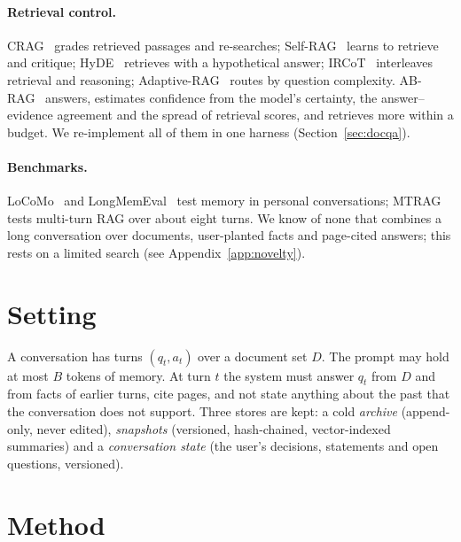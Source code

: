 \documentclass[10pt,twocolumn]{article}
\begin{document}
\paragraph{Retrieval control.}
CRAG~\cite{yan2024crag} grades retrieved passages and re-searches; Self-RAG~\cite{asai2023selfrag} learns to retrieve and critique; HyDE~\cite{gao2022hyde} retrieves with a hypothetical answer; IRCoT~\cite{trivedi2022ircot} interleaves retrieval and reasoning; Adaptive-RAG~\cite{jeong2024adaptiverag} routes by question complexity. AB-RAG~\cite{kamthan2026abrag} answers, estimates confidence from the model's certainty, the answer--evidence agreement and the spread of retrieval scores, and retrieves more within a budget. We re-implement all of them in one harness (Section~\ref{sec:docqa}).

\paragraph{Benchmarks.}
LoCoMo~\cite{maharana2024locomo} and LongMemEval~\cite{wu2024longmemeval} test memory in personal conversations; MTRAG~\cite{katsis2025mtrag} tests multi-turn RAG over about eight turns. We know of none that combines a long conversation over documents, user-planted facts and page-cited answers; this rests on a limited search (see Appendix~\ref{app:novelty}).

\section{Setting}
A conversation has turns $(q_t,a_t)$ over a document set $D$. The prompt may hold at most $B$ tokens of memory. At turn $t$ the system must answer $q_t$ from $D$ and from facts of earlier turns, cite pages, and not state anything about the past that the conversation does not support. Three stores are kept: a cold \emph{archive} (append-only, never edited), \emph{snapshots} (versioned, hash-chained, vector-indexed summaries) and a \emph{conversation state} (the user's decisions, statements and open questions, versioned).

\section{Method}\label{sec:method}
\end{document}
